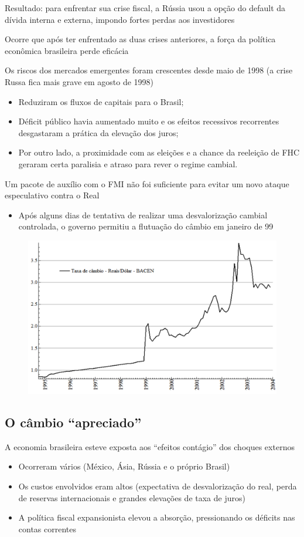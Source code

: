 \documentclass[a4paper,12pt]{article}[abntex2]
\begin{document}
Resultado: para enfrentar sua crise fiscal, a Rússia usou a opção do default da dívida interna e externa, impondo fortes perdas aos investidores

Ocorre que após ter enfrentado as duas crises anteriores, a força da política econômica brasileira perde eficácia

Os riscos dos mercados emergentes foram crescentes desde maio de 1998 (a crise Russa fica mais grave em agosto de 1998)\begin{itemize}
    \item Reduziram os fluxos de capitais para o Brasil; 
    \item Déficit público havia aumentado muito e os efeitos recessivos recorrentes desgastaram a prática da elevação dos juros;
    \item Por outro lado, a proximidade com as eleições e a chance da reeleição de FHC geraram certa paralisia e atraso para rever o regime cambial.
\end{itemize}

Um pacote de auxílio com o FMI não foi suficiente para evitar um novo ataque especulativo contra o Real\begin{itemize}
    \item Após alguns dias de tentativa de realizar uma desvalorização cambial controlada, o governo permitiu a flutuação do câmbio em janeiro de 99
\end{itemize}

\begin{figure}[H]
    \centering
    \includegraphics[width=0.7\linewidth]{Imagens/a15i3.png}
\end{figure}

\subsection{\textbf{O câmbio “apreciado”}}

A economia brasileira esteve exposta aos “efeitos contágio” dos choques externos\begin{itemize}
    \item Ocorreram vários (México, Ásia, Rússia e o próprio Brasil)
    \item Os custos envolvidos eram altos (expectativa de desvalorização do real, perda de reservas internacionais e grandes elevações de taxa de juros)
    \item A política fiscal expansionista elevou a absorção, pressionando os déficits nas contas correntes
\end{itemize}
\end{document}
